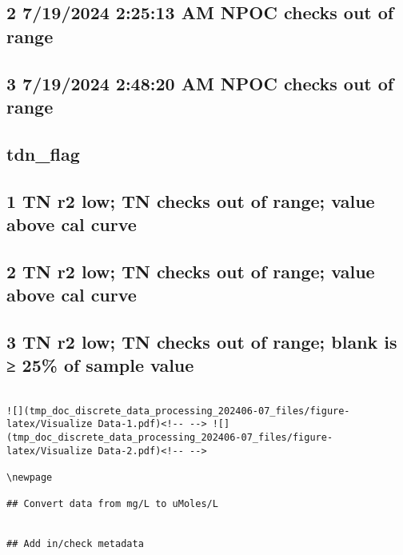 \documentclass[
]{article}
\begin{document}
\hypertarget{am-npoc-checks-out-of-range-1}{%
\subsection{2 7/19/2024 2:25:13 AM NPOC checks out of
range}\label{am-npoc-checks-out-of-range-1}}

\hypertarget{am-npoc-checks-out-of-range-2}{%
\subsection{3 7/19/2024 2:48:20 AM NPOC checks out of
range}\label{am-npoc-checks-out-of-range-2}}

\hypertarget{tdn_flag}{%
\subsection{tdn\_flag}\label{tdn_flag}}

\hypertarget{tn-r2-low-tn-checks-out-of-range-value-above-cal-curve}{%
\subsection{1 TN r2 low; TN checks out of range; value above cal
curve}\label{tn-r2-low-tn-checks-out-of-range-value-above-cal-curve}}

\hypertarget{tn-r2-low-tn-checks-out-of-range-value-above-cal-curve-1}{%
\subsection{2 TN r2 low; TN checks out of range; value above cal
curve}\label{tn-r2-low-tn-checks-out-of-range-value-above-cal-curve-1}}

\hypertarget{tn-r2-low-tn-checks-out-of-range-blank-is-25-of-sample-value}{%
\subsection{3 TN r2 low; TN checks out of range; blank is ≥ 25\% of
sample
value}\label{tn-r2-low-tn-checks-out-of-range-blank-is-25-of-sample-value}}

\begin{verbatim}

![](tmp_doc_discrete_data_processing_202406-07_files/figure-latex/Visualize Data-1.pdf)<!-- --> ![](tmp_doc_discrete_data_processing_202406-07_files/figure-latex/Visualize Data-2.pdf)<!-- --> 

\newpage

## Convert data from mg/L to uMoles/L 


## Add in/check metadata 
\end{verbatim}
\end{document}
